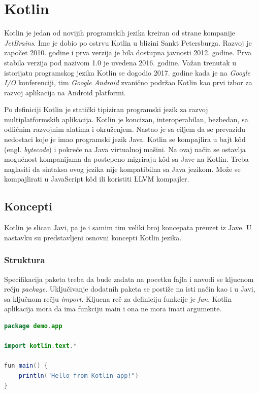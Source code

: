 \documentclass[12pt,oneside]{memoir}
\begin{document}
\section{Kotlin}

Kotlin je jedan od novijih programskih jezika kreiran od strane kompanije \emph{JetBrains}. Ime je dobio po ostrvu Kotlin u blizini Sankt Petersburga. Razvoj je započet 2010. godine i prva verzija je bila dostupna javnosti 2012. godine. Prva stabila verzija pod nazivom 1.0 je uvedena 2016. godine. Važan trenutak u istorijatu programskog jezika Kotlin se dogodio 2017. godine kada je na \emph{Google I/O} konferenciji, tim \emph{Google Android} zvanično podržao Kotlin kao prvi izbor za razvoj aplikacija na Android platformi. 

Po definiciji Kotlin je statički tipiziran programski jezik za razvoj multiplatformskih aplikacija. Kotlin je koncizan, interoperabilan, bezbedan, sa odličnim razvojnim alatima i okruženjem. Nastao je sa ciljem da se prevaziđu nedostaci koje je imao programski jezik Java. Kotlin se kompajlira u bajt kôd (engl. \emph{bytecode}) i pokreće na Java virtualnoj mašini. Na ovaj način se ostavlja mogućnost kompanijama da postepeno migriraju kôd sa Jave na Kotlin. Treba naglasiti da sintaksa ovog jezika nije kompatibilna sa Java jezikom. Može se kompajlirati u JavaScript kôd ili koristiti LLVM kompajler.

\subsection{Koncepti}
Kotlin je slican Javi, pa je i samim tim veliki broj koncepata preuzet iz Jave. U nastavku su predstavljeni osnovni koncepti Kotlin jezika. 
\subsubsection{Struktura}
Specifikacija paketa treba da bude zadata na pocetku fajla i navodi se kljucnom rečju \emph{package}. Uključivanje dodatnih paketa se postiže na isti način kao i u Javi, sa ključnom rečju \emph{import}. Kljucna reč za definiciju funkcije je \emph{fun}. Kotlin aplikacija mora da ima funkciju main i ona ne mora imati argumente. 

\begin{lstlisting}[caption={Struktura Kotlin dokumenta},captionpos=t, language=Java]
package demo.app

import kotlin.text.*

fun main() {
    println("Hello from Kotlin app!")
}
\end{lstlisting}
\end{document}
